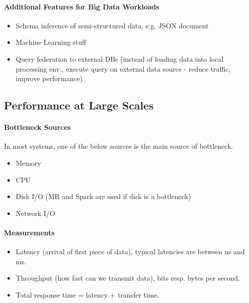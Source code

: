 \paragraph{Additional Features for Big Data Workloads}
\begin{itemize}
    \item Schema inference of semi-structured data, e.g. JSON document
    \item Machine Learning stuff
    \item Query federation to external DBs (instead of loading data into local processing env., execute query on external data source - reduce traffic, improve performance)
\end{itemize}


\subsection{Performance at Large Scales}

\paragraph{Bottleneck Sources}
In most systems, one of the below sources is the main source of bottleneck.
\begin{itemize}
    \item Memory
    \item CPU
    \item Disk I/O (MR and Spark are used if disk is a bottleneck)
    \item Network I/O
\end{itemize}

\paragraph{Measurements}
\begin{itemize}
    \item Latency (arrival of first piece of data), typical latencies are between ns and ms.
    \item Throughput (how fast can we transmit data), bits resp. bytes per second.
    \item Total response time = latency + transfer time.
\end{itemize}


